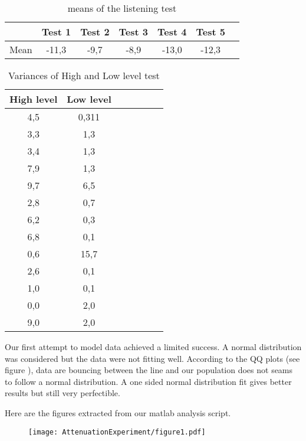 \begin{table}[H]
\centering
\begin{tabular}{*{7}{c}}
  \hline
   & Test 1 & Test 2 & Test 3  & Test 4  & Test 5  
  \\
  \hline
  Mean & -11,3 & -9,7 & -8,9	 & -13,0 & -12,3 \\
  \hline
\end{tabular}
  \caption{means of the listening test}
	\label{tab:MeanListeningResults}
\end{table}

\begin{table}[H]
\centering
\begin{tabular}{*{7}{c}}
  \hline
   High level  & Low level 
  \\
  \hline
  4,5	& 0,311 \\
  3,3	& 1,3 \\
  3,4	& 1,3 \\
  7,9	& 1,3 \\
  9,7	& 6,5 \\
  2,8	& 0,7 \\
  6,2	& 0,3 \\
  6,8	& 0,1 \\
  0,6	& 15,7 \\
  2,6	& 0,1 \\
  1,0	& 0,1 \\
  0,0	& 2,0 \\
  9,0	& 2,0 \\
  \hline
\end{tabular}
  \caption{Variances of High and Low level test}
	\label{tab:VarListeningResults}
\end{table}

Our first attempt to model data achieved a limited success. A normal distribution was considered but the data were not fitting well. According to the QQ plots (see figure ), data are bouncing between the line and our population does not seams to follow a normal distribution. A one sided normal distribution fit gives better results but still very perfectible.


Here are the figures extracted from our matlab analysis script.

\begin{figure}[H]
	\texttt{[image: AttenuationExperiment/figure1.pdf]}
\end{figure}


